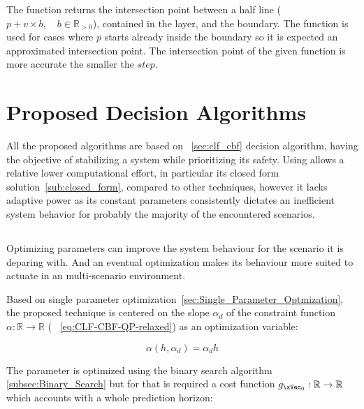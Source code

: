  The function returns the intersection point between a half line (\(p + v \times b, \quad b\in \mathbb{R}_{>0}\)), contained in the layer, and the boundary. The function is used for cases where \(p\) starts  already inside the boundary so it is expected an approximated intersection point. The intersection point of the given function is more accurate the smaller the \(step\). \\

\newpage %

\section{Proposed Decision Algorithms}
\label{sec:Proposed_Decision_Algorithms}

All the proposed algorithms are based on ~\ref{sec:clf_cbf} decision algorithm, having the objective of stabilizing a system while prioritizing its safety. Using  allows a relative lower computational effort, in particular its closed form solution~\ref{sub:closed_form}, compared to other techniques, however it lacks adaptive power as its constant parameters consistently dictates an inefficient system behavior for probably the majority of the encountered  scenarios. \\    


\subsection{}
\label{subsec:Just_Optimized_Algorithm}

Optimizing parameters can improve the system behaviour for the scenario it is deparing with. And an eventual optimization makes its behaviour more suited to actuate in an multi-scenario environment. \par
Based on single parameter optimization~\ref{sec:Single_Parameter_Optmization}, the proposed technique is centered on the slope \(\alpha_d\) of the  constraint function \(\alpha:\mathbb{R} \to \mathbb{R}\) ( ~\ref{eq:CLF-CBF-QP-relaxed}) as an optimization variable:

\begin{equation}
    \alpha(h, \alpha_d) = \alpha_d h
    \label{eq:CBF_Alpha_Formulation_AJO}
\end{equation}

The parameter is optimized using the binary search algorithm \ref{subsec:Binary_Search} but for that is required a cost function \(g_{\xVec_0}:\mathbb{R} \to \mathbb{R}\) which accounts with a whole prediction horizon:

